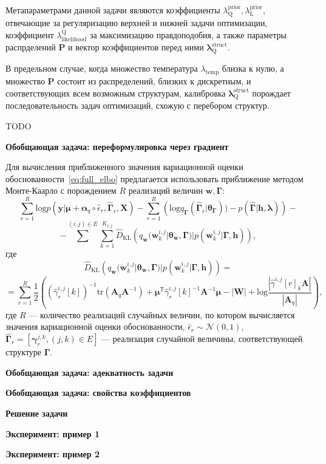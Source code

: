 Метапараметрами данной задачи являются коэффициенты $\lambda^\text{prior}_\text{Q}, \lambda^\text{prior}_\text{L}$, отвечающие за регуляризацию верхней и нижней задачи оптимизации, коэффициент $\lambda_\text{likelihood}^\text{Q}$ за максимизацию правдоподобия, а также параметры распрделений $\mathbf{P}$ и вектор коэффициентов перед ними $\boldsymbol{\lambda}^\text{struct}_\text{Q}$. 

В предельном случае, когда множество температура $\lambda_\text{temp}$ близка к нулю, а множество $\mathbf{P}$ состоит из распределений, близких к дискретным, и соответствующих всем возможным структурам, калибровка $\boldsymbol{\lambda}^\text{struct}_\text{Q}$ порождает последовательность задач оптимизаций, схожую с перебором структур. 

TODO

\textbf{Обобщающая задача: переформулировка через градиент}



Для вычисления приближенного значения вариационной оценки обоснованности~\eqref{eq:full_elbo} предлагается использовать приближение методом Монте-Каарло с порождением $R$ реализаций величин $\mathbf{w}, \boldsymbol{\Gamma}$:
\[
    \sum_{r=1}^R \text{log}p(\mathbf{y}|\boldsymbol{\mu}+\boldsymbol{\alpha}_q \circ \hat{\epsilon}_r, \hat{\boldsymbol{\Gamma}}_r, \mathbf{X}) - \sum_{r=1}^R \left(\text{log}q_{\boldsymbol{\Gamma}}(\hat{\boldsymbol{\Gamma}}_r|\boldsymbol{\theta}_{\boldsymbol{\Gamma}})) - p(\hat{\boldsymbol{\Gamma}}|\mathbf{h},\boldsymbol{\lambda})\right) -
\]
\[
-\sum^{(i,j) \in E}\sum_{k=1}^{K_{i,j}} \hat{D}_\text{KL}\left(q_{\mathbf{w}}(\mathbf{w}^{i,j}_k|\boldsymbol{\theta}_\mathbf{w},\boldsymbol{\Gamma})|p(\mathbf{w}^{i,j}_k|\boldsymbol{\Gamma}, \mathbf{h})\right),
\]
где 
\[
     \hat{D}_\text{KL}\left(q_{\mathbf{w}}(\mathbf{w}^{i,j}_k|\boldsymbol{\theta}_\mathbf{w},\boldsymbol{\Gamma})|p(\mathbf{w}^{i,j}_k|\boldsymbol{\Gamma}, \mathbf{h})\right) = 
\]
\[
= \sum_{r=1}^R\frac{1}{2}\left( \left(\hat{\gamma}^{i,j}_r[k]\right)^{-1}\text{tr}(\mathbf{A}_q\mathbf{A}^{-1}) + \boldsymbol{\mu}^{\mathsf{T}}\hat{\gamma}^{i,j}_r[k]^{-1}\mathbf{A}^{-1}\boldsymbol{\mu} - |\mathbf{W}| + \text{log}\frac{|\hat{\gamma}^{i,j}[r]_k\mathbf{A}|}{|\mathbf{A}_q|}\right),
\]
где $R$ --- количество реализаций случайных величин, по котором вычисляется значения вариационной оценки обоснованности, $\hat{\epsilon}_r \sim \mathcal{N}(0,1),$
 $\hat{\boldsymbol{\Gamma}}_r = [\boldsymbol{\gamma}^{j,k}_r, (j,k) \in E]$ --- реализация случайной величины, соответствующей структуре $\boldsymbol{\Gamma}$.


\textbf{Обобщающая задача: адекватность задачи}

\textbf{Обобщающая задача: свойства коэффициентов}

\textbf{Решение задачи}

\textbf{Эксперимент: пример 1}

\textbf{Эксперимент: пример 2}







